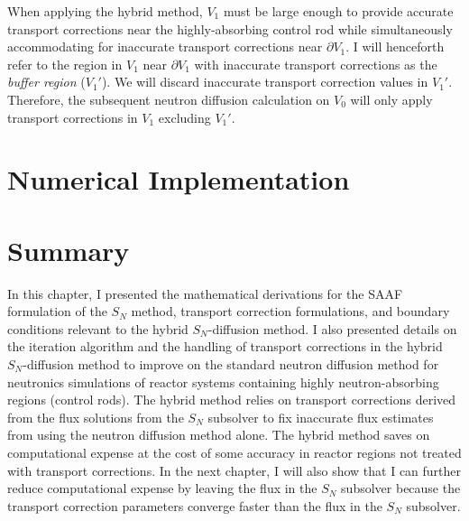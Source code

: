 When applying the hybrid method, $V_1$ must be large enough to provide accurate transport
corrections near the highly-absorbing control rod while simultaneously accommodating for inaccurate
transport corrections near $\partial V_1$. I will henceforth refer to the region in $V_1$
near $\partial V_1$ with inaccurate transport corrections as the \textit{buffer region} ($V_1'$).
We will discard inaccurate transport correction values in $V_1'$. Therefore, the subsequent neutron
diffusion calculation on $V_0$ will only apply transport corrections in $V_1$ excluding $V_1'$.

\section{Numerical Implementation}

\section{Summary} \label{sec:hybrid-summary}

In this chapter, I presented the mathematical derivations for the \gls{SAAF} formulation of the
$S_N$ method, transport correction formulations, and boundary conditions relevant to the hybrid
$S_N$-diffusion method. I also presented details on the iteration algorithm and the handling of
transport corrections in the hybrid $S_N$-diffusion method to improve on the standard neutron
diffusion method for neutronics simulations of reactor systems containing highly neutron-absorbing
regions (control rods). The hybrid method relies on transport corrections derived from the flux
solutions from the $S_N$ subsolver to fix inaccurate flux estimates from using the neutron
diffusion method alone. The hybrid method saves on computational expense at the cost of some
accuracy in reactor regions not treated with transport corrections. In the next chapter, I will
also show that I can further reduce computational expense by leaving the flux in the $S_N$
subsolver because the transport correction parameters converge faster than the flux in the $S_N$
subsolver.


